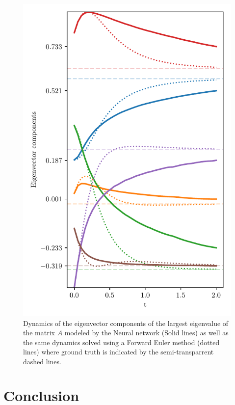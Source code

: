 \documentclass[reprint, english, nofootinbib]{revtex4-2}
\begin{document}


\begin{figure}[h!tb]
   \center
   \includegraphics[width=.8\columnwidth]{eigenvec_dynamics.pdf} 
   \caption{\label{fig:eigenvector} Dynamics of the eigenvector components of the largest eigenvalue of the matrix $A$ modeled by the Neural network (Solid lines) as well as the same dynamics solved using a Forward Euler method (dotted lines) where ground truth is indicated by the semi-transparrent dashed lines.}
\end{figure}


\section{Conclusion}

\onecolumngrid

\twocolumngrid
\end{document}
